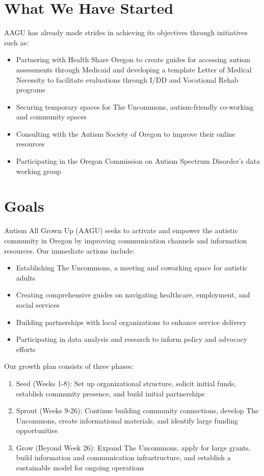 \documentclass[
  letterpaper,
  DIV=11,
  numbers=noendperiod]{scrreprt}
\providecommand{\tightlist}{%
  \setlength{\itemsep}{0pt}\setlength{\parskip}{0pt}}\usepackage{longtable,booktabs,array}
\begin{document}
\hypertarget{sec-aagu_started}{%
\section{What We Have Started}\label{sec-aagu_started}}

AAGU has already made strides in achieving its objectives through
initiatives such as:

\begin{itemize}
\tightlist
\item
  Partnering with Health Share Oregon to create guides for accessing
  autism assessments through Medicaid and developing a template Letter
  of Medical Necessity to facilitate evaluations through I/DD and
  Vocational Rehab programs
\item
  Securing temporary spaces for The Uncommons, autism-friendly
  co-working and community spaces
\item
  Consulting with the Autism Society of Oregon to improve their online
  resources
\item
  Participating in the Oregon Commission on Autism Spectrum Disorder's
  data working group
\end{itemize}

\hypertarget{sec-aagu_goals}{%
\section{Goals}\label{sec-aagu_goals}}

Autism All Grown Up (AAGU) seeks to activate and empower the autistic
community in Oregon by improving communication channels and information
resources. Our immediate actions include:

\begin{itemize}
\tightlist
\item
  Establishing The Uncommons, a meeting and coworking space for autistic
  adults
\item
  Creating comprehensive guides on navigating healthcare, employment,
  and social services
\item
  Building partnerships with local organizations to enhance service
  delivery
\item
  Participating in data analysis and research to inform policy and
  advocacy efforts
\end{itemize}

Our growth plan consists of three phases:

\begin{enumerate}
\def\labelenumi{\arabic{enumi}.}
\tightlist
\item
  Seed (Weeks 1-8): Set up organizational structure, solicit initial
  funds, establish community presence, and build initial partnerships
\item
  Sprout (Weeks 9-26): Continue building community connections, develop
  The Uncommons, create informational materials, and identify large
  funding opportunities
\item
  Grow (Beyond Week 26): Expand The Uncommons, apply for large grants,
  build information and communication infrastructure, and establish a
  sustainable model for ongoing operations
\end{enumerate}
\end{document}
